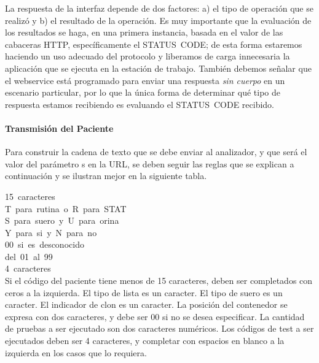 \documentclass[titlepage,12pt]{article}
\begin{document}
La respuesta de la interfaz depende de dos factores: a) el tipo de
operación que se realizó y b) el resultado de la operación. Es muy
importante que la evaluación de los resultados se haga, en una primera
instancia, basada en el valor de las cabaceras \textsf{HTTP},
específicamente el \textsf{STATUS~CODE}; de esta forma estaremos
haciendo un uso adecuado del protocolo y liberamos de carga
innecesaria la aplicación que se ejecuta en la estación de
trabajo. También debemos señalar que el webservice está programado
para enviar una respuesta \emph{sin cuerpo} en un escenario
particular, por lo que la única forma de determinar qué tipo de
respuesta estamos recibiendo es evaluando el \textsf{STATUS~CODE}
recibido.

\paragraph{Transmisión del Paciente} 

Para construir la cadena de texto que se debe enviar al analizador, y
que será el valor del parámetro \textsf{s} en la URL, se deben seguir
las reglas que se explican a continuación y se ilustran mejor en la
siguiente tabla.

  \noindent{}\dotfill \mbox{15
    caracteres} \\
  \dotfill
  \mbox{\textsf{T} para rutina o \textsf{R} para STAT}
  \\
  \dotfill \mbox{\textsf{S} para
    suero y \textsf{U} para orina} \\
  \dotfill \mbox{\textsf{Y} para si y
    \textsf{N} para no} \\
  \dotfill \mbox{00 si es desconocido}
  \\
  \dotfill
  \mbox{del 01 al 99} \\
  \dotfill \mbox{4 caracteres} \\


Si el código del paciente tiene menos de 15 caracteres, deben ser
completados con ceros a la izquierda. El tipo de lista es un
caracter. El tipo de suero es un caracter. El indicador de clon es un
caracter. La posición del contenedor se expresa con dos caracteres, y
debe ser 00 si no se desea especificar. La cantidad de pruebas a ser
ejecutado son dos caracteres numéricos. Los códigos de test a ser
ejecutados deben ser 4 caracteres, y completar con espacios en blanco
a la izquierda en los casos que lo requiera.
\end{document}
